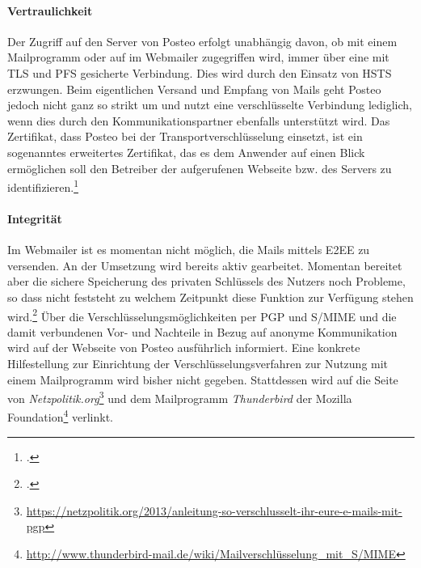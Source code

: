 \documentclass  [paper=a4,
				fontsize=12pt,
				listof=totoc,
				bibliography=totoc
				]{scrreprt}
\begin{document}
				\paragraph{Vertraulichkeit}
					Der Zugriff auf den Server von Posteo erfolgt unabhängig davon, ob mit einem Mailprogramm oder auf im Webmailer zugegriffen wird, immer über eine mit \ac{TLS} und \ac{PFS} gesicherte Verbindung.
					Dies wird durch den Einsatz von \ac{HSTS} erzwungen.
					Beim eigentlichen Versand und Empfang von Mails geht Posteo jedoch nicht ganz so strikt um und nutzt eine verschlüsselte Verbindung lediglich, wenn dies durch den Kommunikationspartner ebenfalls unterstützt wird.
					Das Zertifikat, dass Posteo bei der Transportverschlüsselung einsetzt, ist ein sogenanntes erweitertes Zertifikat, das es dem Anwender auf einen Blick ermöglichen soll den Betreiber der aufgerufenen Webseite bzw. des Servers zu identifizieren.\footcite[Vgl.][]{Posteo2013c}
					
				\paragraph{Integrität}
				
					Im Webmailer ist es momentan nicht möglich, die Mails mittels \ac{E2EE} zu versenden.
					An der Umsetzung wird bereits aktiv gearbeitet.
					Momentan bereitet aber die sichere Speicherung des privaten Schlüssels des Nutzers noch Probleme, so dass nicht feststeht zu welchem Zeitpunkt diese Funktion zur Verfügung stehen wird.\footcite[Vgl.][]{Posteo2013c}
					Über die Verschlüsselungsmöglichkeiten per \ac{PGP} und \ac{S/MIME} und die damit verbundenen Vor- und Nachteile in Bezug auf anonyme Kommunikation wird auf der Webseite von Posteo ausführlich informiert.
					Eine konkrete Hilfestellung zur Einrichtung der Verschlüsselungsverfahren zur Nutzung mit einem Mailprogramm wird bisher nicht gegeben.
					Stattdessen wird auf die Seite von \textit{Netzpolitik.org}\footnote{\url{https://netzpolitik.org/2013/anleitung-so-verschlusselt-ihr-eure-e-mails-mit-pgp}} und dem Mailprogramm \textit{Thunderbird} der Mozilla Foundation\footnote{\url{http://www.thunderbird-mail.de/wiki/Mailverschlüsselung_mit_S/MIME}} verlinkt.
				
\end{document}
